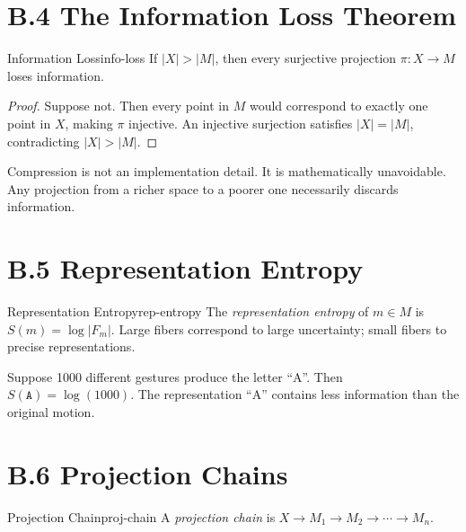 \section*{B.4 The Information Loss Theorem}

\begin{theorem}{Information Loss}{info-loss}
  If $|X| > |M|$, then every surjective projection $\pi : X \to M$
  loses information.
\end{theorem}

\begin{proof}
  Suppose not. Then every point in $M$ would correspond to exactly one point
  in $X$, making $\pi$ injective. An injective surjection satisfies
  $|X| = |M|$, contradicting $|X| > |M|$.
\end{proof}

\begin{warning}
  Compression is not an implementation detail. It is mathematically
  unavoidable. Any projection from a richer space to a poorer one
  necessarily discards information.
\end{warning}

\section*{B.5 Representation Entropy}

\begin{definition}{Representation Entropy}{rep-entropy}
  The \emph{representation entropy} of $m \in M$ is
  $S(m) = \log |F_m|$.
  Large fibers correspond to large uncertainty;
  small fibers to precise representations.
\end{definition}

\begin{example}
  Suppose 1000 different gestures produce the letter ``A''. Then
  $S(\texttt{A}) = \log(1000)$. The representation ``A'' contains
  less information than the original motion.
\end{example}

\section*{B.6 Projection Chains}

\begin{definition}{Projection Chain}{proj-chain}
  A \emph{projection chain} is
  $X \to M_1 \to M_2 \to \cdots \to M_n$.
\end{definition}

